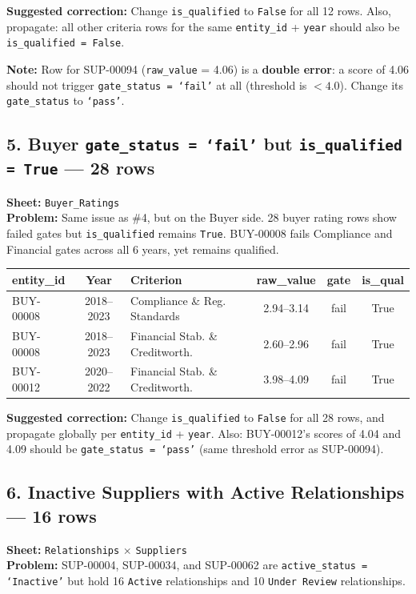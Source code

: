 \documentclass[11pt]{article}
\begin{document}
\noindent\textbf{Suggested correction:} Change \texttt{is\_qualified} to \texttt{False} for all 12 rows. Also, propagate: all other criteria rows for the same \texttt{entity\_id} + \texttt{year} should also be \texttt{is\_qualified = False}.

\medskip
\noindent\textbf{Note:} Row for SUP-00094 (\texttt{raw\_value} = 4.06) is a \textbf{double error}: a score of 4.06 should not trigger \texttt{gate\_status = `fail'} at all (threshold is $< 4.0$). Change its \texttt{gate\_status} to \texttt{`pass'}.

\bigskip

\subsection*{5. Buyer \texttt{gate\_status = `fail'} but \texttt{is\_qualified = True} --- 28 rows}
\textbf{Sheet:} \texttt{Buyer\_Ratings}\\
\textbf{Problem:} Same issue as \#4, but on the Buyer side. 28 buyer rating rows show failed gates but \texttt{is\_qualified} remains \texttt{True}. BUY-00008 fails Compliance and Financial gates across all 6 years, yet remains qualified.

\begin{center}
\begin{tabular}{lclccc}
\toprule
\textbf{entity\_id} & \textbf{Year} & \textbf{Criterion} & \textbf{raw\_value} & \textbf{gate} & \textbf{is\_qual} \\
\midrule
BUY-00008 & 2018--2023 & Compliance \& Reg. Standards & 2.94--3.14 & fail & \textcolor{critred}{True} \\
BUY-00008 & 2018--2023 & Financial Stab. \& Creditworth. & 2.60--2.96 & fail & \textcolor{critred}{True} \\
BUY-00012 & 2020--2022 & Financial Stab. \& Creditworth. & 3.98--4.09 & fail & \textcolor{critred}{True} \\
\bottomrule
\end{tabular}
\end{center}

\noindent\textbf{Suggested correction:} Change \texttt{is\_qualified} to \texttt{False} for all 28 rows, and propagate globally per \texttt{entity\_id} + \texttt{year}. Also: BUY-00012's scores of 4.04 and 4.09 should be \texttt{gate\_status = `pass'} (same threshold error as SUP-00094).

\bigskip

\subsection*{6. Inactive Suppliers with Active Relationships --- 16 rows}
\textbf{Sheet:} \texttt{Relationships} $\times$ \texttt{Suppliers}\\
\textbf{Problem:} SUP-00004, SUP-00034, and SUP-00062 are \texttt{active\_status = `Inactive'} but hold 16 \texttt{Active} relationships and 10 \texttt{Under Review} relationships.
\end{document}
